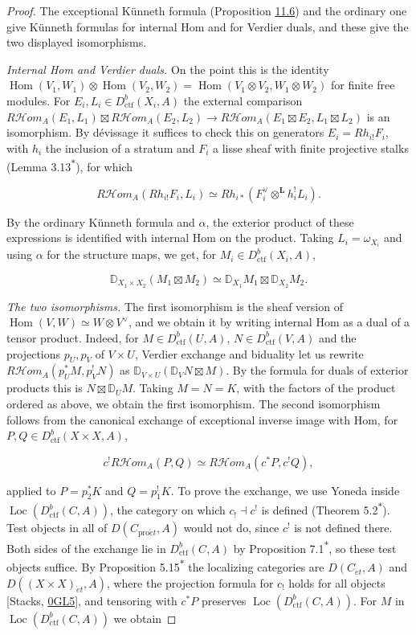 \documentclass[11pt]{article}
\newcommand{\bpout}[1]{#1\textsuperscript{\hyperlink{bp-outside}{\ensuremath{\ast}}}}
\providecommand{\Hom}{}\renewcommand{\Hom}{\operatorname{Hom}}
\providecommand{\Loc}{}\renewcommand{\Loc}{\operatorname{Loc}}
\providecommand{\cHom}{}\renewcommand{\cHom}{R\mathcal{H}\!om}
\begin{document}
\begin{proof}[{Proof}]\label{bp23}%
The exceptional Künneth formula (Proposition \hyperref[bp19]{11.6}) and the ordinary one give Künneth formulas for internal Hom and for Verdier duals, and these give the two displayed isomorphisms.

\emph{Internal Hom and Verdier duals.} On the point this is the identity \(\Hom(V_1,W_1)\otimes\Hom(V_2,W_2)=\Hom(V_1\otimes V_2,W_1\otimes W_2)\) for finite free modules. For \(E_i,L_i\in D^b_{\mathrm{ctf}}(X_i,A)\) the external comparison \(\cHom_A(E_1,L_1)\boxtimes\cHom_A(E_2,L_2)\to
\cHom_A(E_1\boxtimes E_2,L_1\boxtimes L_2)\) is an isomorphism. By dévissage it suffices to check this on generators \(E_i=Rh_{i!}F_i\), with \(h_i\) the inclusion of a stratum and \(F_i\) a lisse sheaf with finite projective stalks (Lemma \bpout{3.13}), for which

\[
\cHom_A(Rh_{i!}F_i,L_i)
\simeq Rh_{i*}(F_i^\vee\otimes^{\mathbf L} h_i^!L_i).
\]

By the ordinary Künneth formula and \(\alpha\), the exterior product of these expressions is identified with internal Hom on the product. Taking \(L_i=\omega_{X_i}\) and using \(\alpha\) for the structure maps, we get, for \(M_i\in D^b_{\mathrm{ctf}}(X_i,A)\),

\[
\mathbb D_{X_1\times X_2}(M_1\boxtimes M_2)
\simeq \mathbb D_{X_1}M_1\boxtimes \mathbb D_{X_2}M_2.
\]

\emph{The two isomorphisms.} The first isomorphism is the sheaf version of \(\Hom(V,W)\simeq W\otimes V^\vee\), and we obtain it by writing internal Hom as a dual of a tensor product. Indeed, for \(M\in D^b_{\mathrm{ctf}}(U,A)\), \(N\in D^b_{\mathrm{ctf}}(V,A)\) and the projections \(p_U,p_V\) of \(V\times U\), Verdier exchange and biduality let us rewrite \(\cHom_A(p_U^*M,p_V^!N)\) as \(\mathbb D_{V\times U}(\mathbb D_VN\boxtimes M)\). By the formula for duals of exterior products this is \(N\boxtimes \mathbb D_UM\). Taking \(M=N=K\), with the factors of the product ordered as above, we obtain the first isomorphism. The second isomorphism follows from the canonical exchange of exceptional inverse image with Hom, for \(P,Q\in D^b_{\mathrm{ctf}}(X\times X,A)\),

\[
c^!\cHom_A(P,Q)\simeq\cHom_A(c^*P,c^!Q),
\]

applied to \(P=p_2^*K\) and \(Q=p_1^!K\). To prove the exchange, we use Yoneda inside \(\Loc(D^b_{\mathrm{ctf}}(C,A))\), the category on which \(c_!\dashv c^!\) is defined (Theorem \bpout{5.2}). Test objects in all of \(D(C_{\mathrm{pro}\acute{e}t},A)\) would not do, since \(c^!\) is not defined there. Both sides of the exchange lie in \(D^b_{\mathrm{ctf}}(C,A)\) by Proposition \bpout{7.1}, so these test objects suffice. By Proposition \bpout{5.15} the localizing categories are \(D(C_{\acute{e}t},A)\) and \(D((X\times X)_{\acute{e}t},A)\), where the projection formula for \(c_!\) holds for all objects [Stacks, \href{https://stacks.math.columbia.edu/tag/0GL5}{0GL5}], and tensoring with \(c^*P\) preserves \(\Loc(D^b_{\mathrm{ctf}}(C,A))\). For \(M\) in \(\Loc(D^b_{\mathrm{ctf}}(C,A))\) we obtain


\end{proof}
\end{document}
